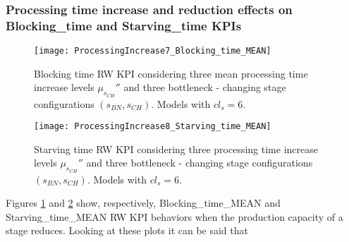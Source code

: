 \subsubsection{Processing time increase and reduction effects on Blocking\_time and Starving\_time KPIs}
\begin{figure}[h] 
\centering
\texttt{[image: ProcessingIncrease7\_Blocking\_time\_MEAN]}
\caption[Blocking time RW KPI behavior with different processing time increase levels]{Blocking time RW KPI considering three mean processing time increase levels $\mu_{s_{CH}}''$ and three bottleneck - changing stage configurations $(s_{BN},s_{CH})$. Models with $cl_s=6$.}
\label{fig:Blocking time RW KPI behavior with different processing time increase levels}
\end{figure}
\begin{figure}[h] 
\centering
\texttt{[image: ProcessingIncrease8\_Starving\_time\_MEAN]}
\caption[Starving time RW KPI behavior with different processing time increase levels]{Starving time RW KPI considering three processing time increase levels $\mu_{s_{CH}}''$ and three bottleneck - changing stage configurations $(s_{BN},s_{CH})$. Models with $cl_s=6$.}
\label{fig:Starving time RW KPI behavior with different processing time increase levels}
\end{figure}
Figures \ref{fig:Blocking time RW KPI behavior with different processing time increase levels} and \ref{fig:Starving time RW KPI behavior with different processing time increase levels} show, respectively, Blocking\_time\_MEAN and Starving\_time\_MEAN RW KPI behaviors when the production capacity of a stage reduces. Looking at these plots it can be said that
